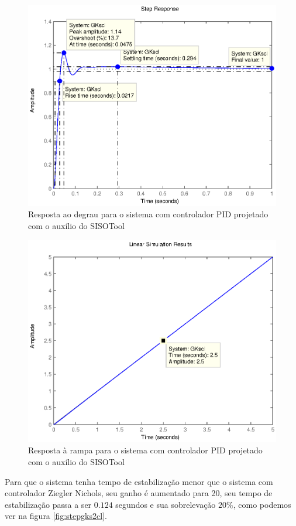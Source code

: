 \documentclass{article}
\begin{document}
	\begin{figure}[H]
		\centering
		\includegraphics[width=0.8\linewidth]{stepgkscl}
		\caption{Resposta ao degrau para o sistema com controlador PID projetado com o auxílio do SISOTool}
		\label{fig:stepgkscl}
	\end{figure}
	\begin{figure}[H]
		\centering
		\includegraphics[width=0.8\linewidth]{rampgkscl}
		\caption{Resposta à rampa para o sistema com controlador PID projetado com o auxílio do SISOTool}
		\label{fig:rampgkscl}
	\end{figure}
Para que o sistema tenha tempo de estabilização menor que o sistema com controlador Ziegler Nichols, seu ganho é aumentado para 20, seu tempo de estabilização passa a ser $0.124$ segundos e sua sobrelevação $20\%$, como podemos ver na figura \ref{fig:stepgks2cl}.
\end{document}
